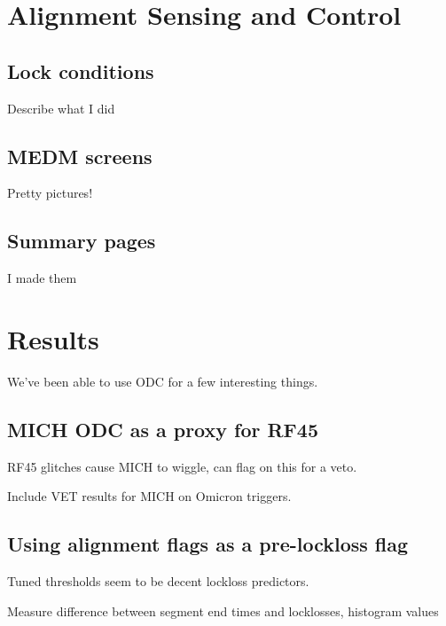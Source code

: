 \section{Alignment Sensing and Control}

\subsection{Lock conditions}

Describe what I did

\subsection{MEDM screens}
Pretty pictures!

\subsection{Summary pages}
I made them

\section{Results}

We've been able to use ODC for a few interesting things.

\subsection{MICH ODC as a proxy for RF45}

RF45 glitches cause MICH to wiggle, can flag on this for a veto. 

Include VET results for MICH on Omicron triggers.

\subsection{Using alignment flags as a pre-lockloss flag}

Tuned thresholds seem to be decent lockloss predictors.

Measure difference between segment end times and locklosses, histogram values


